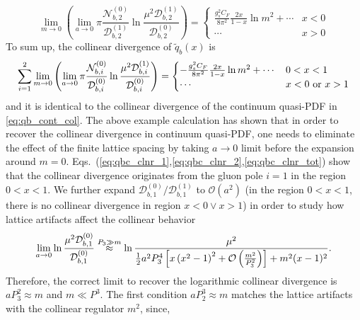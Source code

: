 \documentclass[english,preprint,aps,prd,showpacs,superscriptaddress,nofootinbib,tightenlines]{revtex4}
\newcommand{\emphz}[1]{\textcolor{black}{#1}}
\begin{document}
\begin{equation}\label{eq:qbc_clnr_2}
\lim_{m\rightarrow 0}\left(\lim_{a\rightarrow 0}\pi\frac{\mathcal{N}_{b,2}^{(0)}}{\mathcal{D}_{b,2}^{(1)}}
\ln\frac{\mu^2\mathcal{D}_{b,2}^{(1)}}{\mathcal{D}_{b,2}^{(0)}}\right)=
\begin{cases}
\frac{g_s^2 C_F}{8\pi^2}\frac{2x}{1-x}\ln m^2+\cdots & x<0\\
\cdots & x>0
\end{cases}
\end{equation}
To sum up, the collinear divergence of $\tilde{q}_b\left(x\right)$ is
\begin{equation}\label{eq:qbc_clnr_tot}
\sum_{i=1}^2\lim_{m\rightarrow 0}\left(\lim_{a\rightarrow 0}\pi\frac{\mathcal{N}_{b,i}^{(0)}}{\mathcal{D}_{b,i}^{(0)}}
\ln\frac{\mu^2\mathcal{D}_{b,i}^{(1)}}{\mathcal{D}_{b,i}^{(0)}}\right)=
\begin{cases}
\emphz{-}\frac{g_s^2 C_F}{8\pi^2}\frac{2x}{1-x}\ln m^2+\cdots & 0<x<1\\
\cdots & x<0 \text{ or } x>1
\end{cases}
\end{equation}
and it is identical to the collinear divergence of the continuum quasi-PDF in \eqref{eq:qb_cont_col}. The above example calculation has shown that in order to recover the collinear divergence in continuum quasi-PDF,
one needs to eliminate the effect of the finite lattice spacing by taking $a\rightarrow 0$ limit before the expansion around $m=0$. {Eqs.~(\ref{eq:qbc_clnr_1},\ref{eq:qbc_clnr_2},\ref{eq:qbc_clnr_tot}) show that the collinear divergence originates from the gluon pole $i=1$ in the region 
$0<x<1$.  We further expand $\mathcal{D}_{b,1}^{(0)}/\mathcal{D}_{b,1}^{(1)}$ to 
$\mathcal{O}\left(a^2\right)$ (in the region $0<x<1$, there is no collinear divergence in region $x<0\lor x>1$) in order to study how lattice artifacts affect the 
collinear behavior
\begin{align}
\lim_{a\rightarrow 0 }\ln \frac{\mu^2\mathcal{D}_{b,1}^{(0)}}{\mathcal{D}_{b,1}^{(0)}} %
\overset{\scriptsize{P_3\gg m}}{\approx} \ln \frac{\mu^2}{\frac{1}{2} a^2P_3^4 \left[x \left(x^2-1\right)^2 + \mathcal{O}\left(\frac{m^2}{P_3^2}\right)\right]+m^2 (x-1)^2}.
\end{align}}
Therefore, the correct limit to recover the logarithmic collinear divergence is $aP_3^2\approx m$ and 
$m\ll P^3$. The first condition $aP^3_2\approx m$ matches the lattice artifacts with the collinear regulator $m^2$, since,
\end{document}
